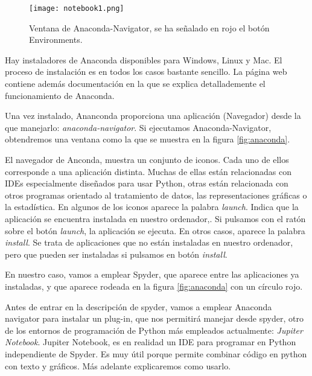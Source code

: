 \begin{figure}
\centering
    \texttt{[image: notebook1.png]}
    \caption{Ventana de Anaconda-Navigator, se ha señalado en rojo el botón Environments.}
    \label{fig:ntb1}
\end{figure}
\begin{paracol}{2}
 Hay instaladores de Anaconda disponibles para Windows, Linux y Mac. El proceso de instalación es en todos los casos bastante sencillo. La página web contiene además documentación en la que se explica detallademente el funcionamiento de Anaconda.

 Una vez instalado, Ananconda proporciona una aplicación (Navegador) desde la que manejarlo: \emph{anaconda-navigator}. Si ejecutamos Anaconda-Navigator, obtendremos una ventana como la que se muestra en la figura \ref{fig:anaconda}.

 El navegador de Anconda, muestra un conjunto de iconos. Cada uno de ellos corresponde a una aplicación distinta. Muchas de ellas están relacionadas con IDEs especialmente diseñados para usar Python, otras están relacionada con otros programas orientado al tratamiento de datos, las representaciones gráficas o la estadística. En algunos de los iconos aparece la palabra \emph{launch}. Indica que la aplicación se encuentra instalada en nuestro ordenador,. Si pulsamos con el ratón sobre el botón \emph{launch}, la aplicación se ejecuta. En otros casos, aparece la palabra \emph{install}. Se trata de aplicaciones que no están instaladas en nuestro ordenador, pero que pueden ser instaladas si pulsamos en botón \emph{install}. 

 En nuestro caso, vamos a emplear Spyder, que aparece entre las aplicaciones ya instaladas, y que aparece rodeada en la figura \ref{fig:anaconda} con un círculo rojo.

 Antes de entrar en la descripción de spyder, vamos a emplear Anaconda navigator para instalar un plug-in, que nos permitirá manejar desde spyder, otro de los entornos de programación de Python más empleados actualmente: \emph{Jupiter Notebook}. Jupiter Notebook, es en realidad un IDE para programar en Python independiente de Spyder. Es muy útil porque permite combinar código en python con texto y gráficos. Más adelante explicaremos como usarlo.


\end{paracol}
